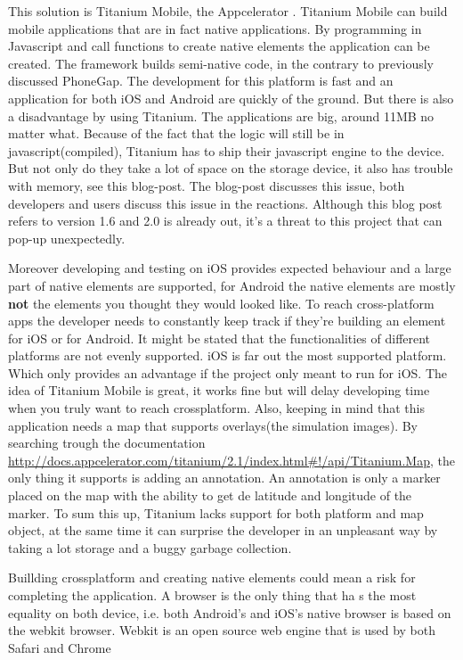 This solution is Titanium Mobile, the Appcelerator \cite{Titanium-Appcelerator}. Titanium Mobile can build mobile applications that are in fact native applications. By programming in Javascript and call functions to create native elements the application can be created. The framework builds semi-native code, in the contrary to previously discussed PhoneGap. The development for this platform is fast and an application for both iOS and Android are quickly of the ground. But there is also a disadvantage by using Titanium. The applications are big, around 11MB no matter what. Because of the fact that the logic will still be in javascript(compiled), Titanium has to ship their javascript engine to the device. But not only do they take a lot of space on the storage device, it also has trouble with memory, see this blog-post\cite{memoryleak}. The blog-post discusses this issue, both developers and users discuss this issue in the reactions. Although this blog post refers to version 1.6 and 2.0 is already out, it's a threat to this project that can pop-up unexpectedly.

Moreover developing and testing on iOS provides expected behaviour and a large part of native elements are supported, for Android the native elements are mostly \textbf{not} the elements you thought they would looked like. To reach cross-platform apps the developer needs to constantly keep track if they're building an element for iOS or for Android. It might be stated that the functionalities of different platforms are not evenly supported. iOS is far out the most supported platform. Which only provides an advantage if the project only meant to run for iOS. The idea of Titanium Mobile is great, it works fine but will delay developing time when you truly want to reach crossplatform. Also, keeping in mind that this application needs a map that supports overlays(the simulation images). By searching trough the documentation \url{http://docs.appcelerator.com/titanium/2.1/index.html#!/api/Titanium.Map}, the only thing it supports is adding an annotation. An annotation is only a marker placed on the map with the ability to get de latitude and longitude of the marker. To sum this up, Titanium lacks support for both platform and map object, at the same time it can surprise the developer in an unpleasant  way by taking a lot storage and a buggy garbage collection.

Buillding crossplatform and creating native elements could mean a risk for completing the application. A browser is the only thing that ha s the most equality on both device, i.e. both Android's and iOS's native browser is based on the webkit browser. Webkit is an open source web engine that is used by both Safari and Chrome
